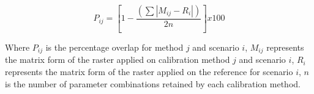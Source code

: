 \begin{equation}
	P_{ij} = [1- \frac{(\sum|M_{ij} - R_i|)	}{2n}] x 100%
	\label{e4}
\end{equation} 


Where $P_{ij}$ is the percentage overlap for method $j$ and scenario $i$, $M_{ij}$ represents the matrix
form of the raster applied on calibration method $j$ and scenario $i$, $R_i$ represents the matrix
form of the raster applied on the reference for scenario $i$, $n$ is the number of parameter combinations retained by each calibration method.
